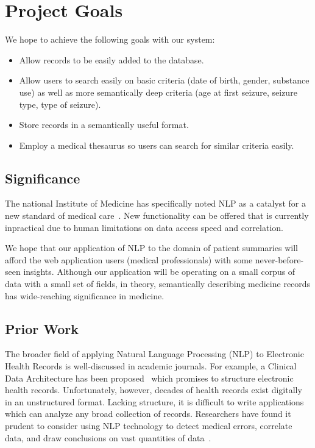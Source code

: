\documentclass{acm_proc_article-sp}
\begin{document}
\section{Project Goals}
We hope to achieve the following goals with our system:
\begin{itemize}
	\item Allow records to be easily added to the database.
	\item Allow users to search easily on basic criteria (date of birth, gender,
substance use) as well as more semantically deep criteria (age at first seizure,
seizure type, type of seizure).
    \item Store records in a semantically useful format.
	\item Employ a medical thesaurus so users can search for similar criteria easily.
\end{itemize}

\subsection{Significance}
The national Institute of Medicine has specifically noted NLP as a catalyst for a new
standard of medical care~\cite{friedman}. New functionality can be offered that is currently
inpractical due to human limitations on data access speed and correlation.

We hope that our application of NLP to the domain of patient summaries will afford the
web application users (medical professionals) with some never-before-seen insights.
Although our application will be operating on a small corpus of data with a small set 
of fields, in theory, semantically describing medicine records has wide-reaching 
significance in medicine.

\subsection{Prior Work}
The broader field of applying Natural Language Processing (NLP) to Electronic Health Records
is well-discussed in academic journals. For example, a Clinical Data Architecture has been
proposed~\cite{CDA} which promises to structure electronic health records. Unfortunately, however,
decades of health records exist digitally in an unstructured format. Lacking structure, it is
difficult to write applications which can analyze any broad collection of records. Researchers
have found it prudent to consider using NLP technology to detect medical errors, correlate data, 
and draw conclusions on vast quantities of data~\cite{friedman}.
\end{document}
